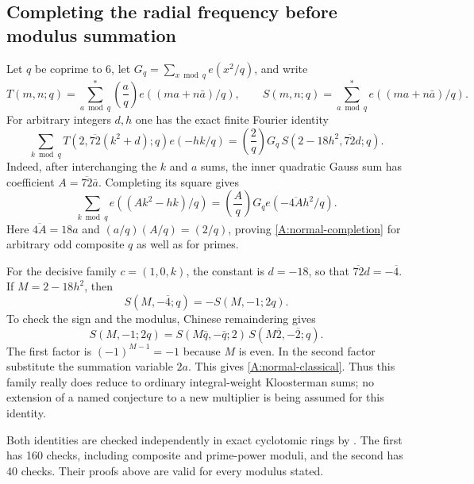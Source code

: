 \subsection*{Completing the radial frequency before modulus summation}

Let $q$ be coprime to $6$, let
$G_q=\sum_{x\bmod q}e(x^2/q)$, and write
\[
 T(m,n;q)=\sum_{a\bmod q}^{*}
       \left(\frac aq\right)e((ma+n\bar a)/q),\qquad
 S(m,n;q)=\sum_{a\bmod q}^{*}e((ma+n\bar a)/q).
\]
For arbitrary integers $d,h$ one has the exact finite Fourier identity
\begin{equation}\label{A:normal-completion}
 \sum_{k\bmod q}
   T(2,\overline{72}(k^2+d);q)e(-hk/q)
 =\left(\frac2q\right)G_q\,
       S(2-18h^2,\overline{72}d;q).
\end{equation}
Indeed, after interchanging the $k$ and $a$ sums, the inner
quadratic Gauss sum has coefficient
$A=\overline{72}\bar a$. Completing its square gives
\[
 \sum_{k\bmod q}e((Ak^2-hk)/q)
 =\left(\frac Aq\right)G_q e(-\overline{4A}h^2/q).
\]
Here $\overline{4A}=18a$ and
$(a/q)(A/q)=(2/q)$, proving
\eqref{A:normal-completion} for arbitrary odd composite $q$
as well as for primes.

For the decisive family $c=(1,0,k)$, the constant is $d=-18$,
so that $\overline{72}d=-\overline4$.
If $M=2-18h^2$, then
\begin{equation}\label{A:normal-classical}
 S(M,-\overline4;q)=-S(M,-1;2q).
\end{equation}
To check the sign and the modulus, Chinese remaindering gives
\[
 S(M,-1;2q)
 =S(M\bar q,-\bar q;2)\,
       S(M\overline2,-\overline2;q).
\]
The first factor is $(-1)^{M-1}=-1$ because $M$ is even.
In the second factor substitute the summation variable $2a$.
This gives \eqref{A:normal-classical}. Thus this family really
does reduce to ordinary integral-weight Kloosterman sums;
no extension of a named conjecture to a new multiplier is
being assumed for this identity.

Both identities are checked independently in exact cyclotomic
rings by . The first
has 160 checks, including composite and prime-power moduli,
and the second has 40 checks. Their proofs above are valid
for every modulus stated.

